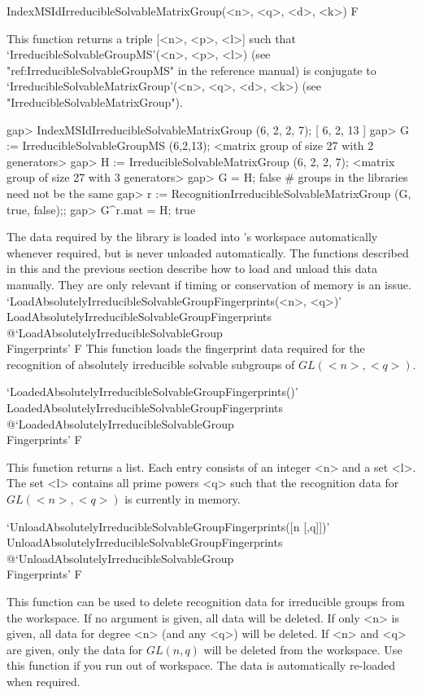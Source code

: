 \>IndexMSIdIrreducibleSolvableMatrixGroup(<n>, <q>, <d>, <k>) F

This function returns a triple [<n>, <p>, <l>] such that
`IrreducibleSolvableGroupMS'(<n>, <p>, <l>) (see "ref:IrreducibleSolvableGroupMS" in the {\GAP} reference manual) is conjugate to
`IrreducibleSolvableMatrixGroup'(<n>, <q>, <d>, <k>) (see "IrreducibleSolvableMatrixGroup").

\beginexample
gap> IndexMSIdIrreducibleSolvableMatrixGroup (6, 2, 2, 7);
[ 6, 2, 13 ]
gap> G := IrreducibleSolvableGroupMS (6,2,13);
<matrix group of size 27 with 2 generators>
gap> H := IrreducibleSolvableMatrixGroup (6, 2, 2, 7);
<matrix group of size 27 with 3 generators>
gap> G = H;
false # groups in the libraries need not be the same
gap> r := RecognitionIrreducibleSolvableMatrixGroup (G, true, false);;
gap> G^r.mat = H;
true
\endexample



The data required by the {\IRREDSOL} library is loaded into {\GAP}'s workspace automatically whenever required, but is never unloaded automatically. The functions described in this
and the previous section describe how to load and unload this data manually. 
They are only relevant if timing or conservation of memory is an issue.
\>`LoadAbsolutelyIrreducibleSolvableGroupFingerprints(<n>, <q>)'%
{LoadAbsolutelyIrreducibleSolvableGroupFingerprints}%
@{`LoadAbsolutelyIrreducibleSolvableGroup\\Fingerprints'} F
This function loads the fingerprint data required for the recognition
of absolutely irreducible solvable subgroups of $GL(<n>, <q>)$.

\>`LoadedAbsolutelyIrreducibleSolvableGroupFingerprints()'%
{LoadedAbsolutelyIrreducibleSolvableGroupFingerprints}%
@{`LoadedAbsolutelyIrreducibleSolvableGroup\\Fingerprints'} F

This function returns a list. Each entry consists of an integer <n> and a set <l>. The set
<l> contains all prime powers <q> such that the recognition data for $GL(<n>, <q>)$ is currently in
memory.

\>`UnloadAbsolutelyIrreducibleSolvableGroupFingerprints([n [,q]])'%
{UnloadAbsolutelyIrreducibleSolvableGroupFingerprints}%
@{`UnloadAbsolutelyIrreducibleSolvableGroup\\Fingerprints'} F

This function can be used to delete recognition data for irreducible groups from the {\GAP} workspace. If no
argument is given, all data will be deleted. If only <n> is given, all data for degree <n> (and any
<q>) will be deleted. If <n> and <q> are given, only the data for $GL(n, q)$ will be deleted from the
{\GAP} workspace. Use this function if you run out of {\GAP} workspace. The
data is automatically re-loaded when required.


